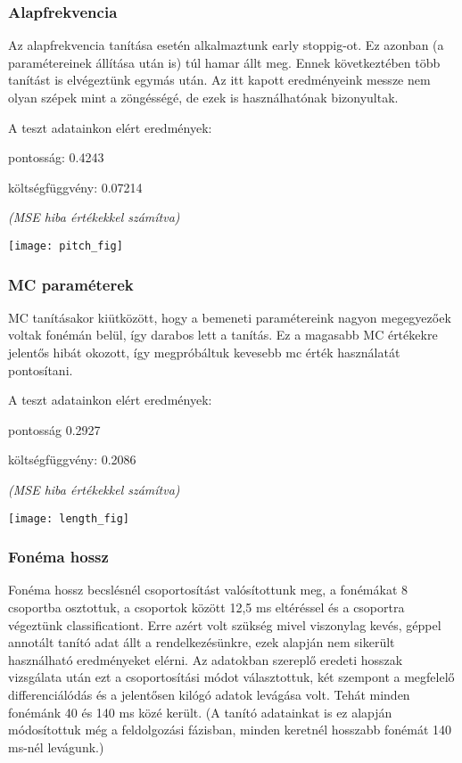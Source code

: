 \subsubsection{Alapfrekvencia}
Az alapfrekvencia tanítása esetén alkalmaztunk early stoppig-ot. Ez azonban (a paramétereinek állítása után is) túl hamar állt meg. Ennek következtében több tanítást is elvégeztünk egymás után. Az itt kapott eredményeink messze nem olyan szépek mint a zöngésségé, de ezek is használhatónak bizonyultak.

A teszt adatainkon elért eredmények:

pontosság: 0.4243

költségfüggvény: 0.07214

\textit{(MSE hiba értékekkel számítva)}

\texttt{[image: pitch\_fig]}
\subsubsection{MC paraméterek}
MC tanításakor kiütközött, hogy a bemeneti paramétereink nagyon megegyezőek voltak fonémán belül, így darabos lett a tanítás. Ez a magasabb MC értékekre jelentős hibát okozott, így megpróbáltuk kevesebb mc érték használatát pontosítani.

\begin{minipage}{0.5\textwidth}	
	A teszt adatainkon elért eredmények:
	
	pontosság 0.2927
	
	költségfüggvény: 0.2086
	
	\textit{(MSE hiba értékekkel számítva)}
\end{minipage}
\begin{minipage}{0.5\textwidth}
	\flushright	
	\texttt{[image: length\_fig]}
\end{minipage}
\subsubsection{Fonéma hossz}
Fonéma hossz becslésnél csoportosítást valósítottunk meg, a fonémákat 8 csoportba osztottuk, a csoportok között 12,5 ms eltéréssel és a csoportra végeztünk classificationt. Erre azért volt szükség mivel viszonylag kevés, géppel annotált tanító adat állt a rendelkezésünkre, ezek alapján nem sikerült használható eredményeket elérni. Az adatokban szereplő eredeti hosszak vizsgálata után ezt a csoportosítási módot választottuk, két szempont a megfelelő differenciálódás és a jelentősen kilógó adatok levágása volt. Tehát minden fonémánk 40 és 140 ms közé került. (A tanító adatainkat is ez alapján módosítottuk még a feldolgozási fázisban, minden keretnél hosszabb fonémát 140 ms-nél levágunk.)

